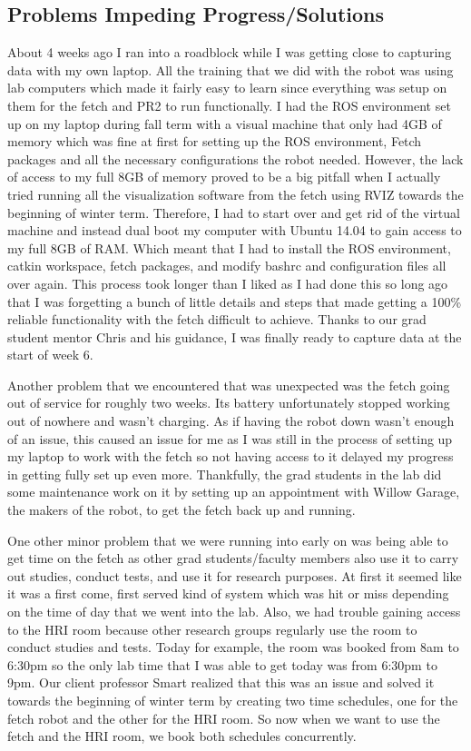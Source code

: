 \documentclass[draftclsnofoot, onecolumn, 10pt, compsoc]{IEEEtran}
\begin{document}
\subsection{Problems Impeding Progress/Solutions}
About 4 weeks ago I ran into a roadblock while I was getting close to capturing data with my own laptop. All the training that we did with the robot was using lab computers which made it fairly easy to learn since everything was setup on them for the fetch and PR2 to run functionally. I had the ROS environment set up on my laptop during fall term with a visual machine that only had 4GB of memory which was fine at first for setting up the ROS environment, Fetch packages and all the necessary configurations the robot needed. However, the lack of access to my full 8GB of memory proved to be a big pitfall when I actually tried running all the visualization software from the fetch using RVIZ towards the beginning of winter term. Therefore, I had to start over and get rid of the virtual machine and instead dual boot my computer with Ubuntu 14.04 to gain access to my full 8GB of RAM. Which meant that I had to install the ROS environment, catkin workspace, fetch packages, and modify bashrc and configuration files all over again. This process took longer than I liked as I had done this so long ago that I was forgetting a bunch of little details and steps that made getting a 100\% reliable functionality with the fetch difficult to achieve. Thanks to our grad student mentor Chris and his guidance, I was finally ready to capture data at the start of week 6.

Another problem that we encountered that was unexpected was the fetch going out of service for roughly two weeks. Its battery unfortunately stopped working out of nowhere and wasn’t charging. As if having the robot down wasn’t enough of an issue, this caused an issue for me as I was still in the process of setting up my laptop to work with the fetch so not having access to it delayed my progress in getting fully set up even more. Thankfully, the grad students in the lab did some maintenance work on it by setting up an appointment with Willow Garage, the makers of the robot, to get the fetch back up and running.

One other minor problem that we were running into early on was being able to get time on the fetch as other grad students/faculty members also use it to carry out studies, conduct tests, and use it for research purposes. At first it seemed like it was a first come, first served kind of system which was hit or miss depending on the time of day that we went into the lab. Also, we had trouble gaining access to the HRI room because other research groups regularly use the room to conduct studies and tests. Today for example, the room was booked from 8am to 6:30pm so the only lab time that I was able to get today was from 6:30pm to 9pm. Our client professor Smart realized that this was an issue and solved it towards the beginning of winter term by creating two time schedules, one for the fetch robot and the other for the HRI room. So now when we want to use the fetch and the HRI room, we book both schedules concurrently.
\end{document}
